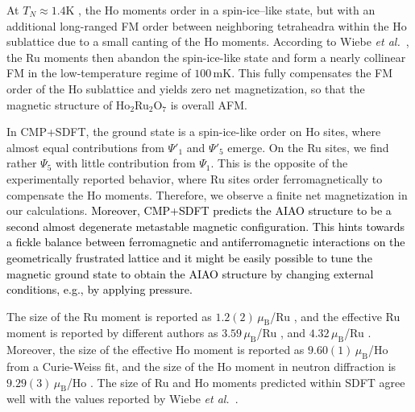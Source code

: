 \documentclass[10pt]{iopart}
\newcommand{\mub}{\,\mu_\text{B}}
\newcommand{\red}[1]{\textcolor{black}{#1}}
\begin{document}
At $T_{N}\approx1.4$K \cite{wiebe2004magnetic}, the Ho moments order in a spin-ice–like state, but with an additional long-ranged FM order between neighboring tetraheadra within the Ho sublattice due to a small canting of the Ho moments. According to Wiebe \emph{et al.\ }\cite{wiebe2004magnetic}, the Ru moments then abandon the spin-ice-like state and form a nearly collinear FM in the low-temperature regime of $100\,$mK. This fully compensates the FM order of the Ho sublattice and yields zero net magnetization, so that the magnetic structure of Ho$_2$Ru$_2$O$_7$ is overall AFM.

In CMP+SDFT, the ground state is a spin-ice-like order on Ho sites, where almost equal contributions from $\Psi'_1$ and $\Psi'_5$ emerge. On the Ru sites, we find rather $\Psi_5$ with little contribution from $\Psi_1$. This is the opposite of the experimentally reported behavior, where Ru sites order ferromagnetically to compensate the Ho moments. Therefore, we observe a finite net magnetization in our calculations. 
\red{Moreover, CMP+SDFT predicts the AIAO structure to be a second almost degenerate metastable magnetic configuration. This hints towards a fickle balance between ferromagnetic and antiferromagnetic interactions on the geometrically frustrated lattice and it might be easily possible to tune the magnetic ground state to obtain the AIAO structure by changing external conditions, e.g., by applying pressure. }

The size of the Ru moment is reported as $1.2(2) \mub$/Ru \cite{wiebe2004magnetic}, and the effective Ru moment is reported by different authors as $3.59 \mub$/Ru \cite{yao2011hydrothermal}, and $4.32 \mub$/Ru \cite{taira2002magnetic}. Moreover, the size of the effective Ho moment is reported as $9.60(1) \mub$/Ho \cite{bansal2003magnetic} from a Curie-Weiss fit, and the size of the Ho moment in neutron diffraction is $9.29(3) \mub$/Ho \cite{wiebe2004magnetic}.
The size of Ru and Ho moments predicted within SDFT agree well with the values reported by Wiebe \emph{et al.\ }\cite{wiebe2004magnetic}.
\end{document}
